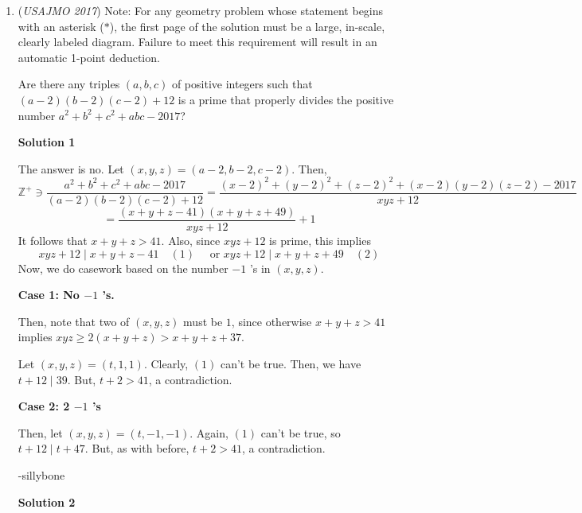 \begin{enumerate}
 By Mathdummy.

 


	\item (\textit{USAJMO 2017}) Note: For any geometry problem whose statement begins with an asterisk ($*$), the first page of the solution must be a large, in-scale, clearly labeled diagram. Failure to meet this requirement will result in an automatic 1-point deduction. 


 Are there any triples $(a,b,c)$ of positive integers such that $(a-2)(b-2)(c-2) + 12$ is a prime that properly divides the positive number $a^2 + b^2 + c^2 + abc - 2017$?


 



\textbf{Solution 1}

The answer is $\boxed{\text{no}}$. Let $(x, y, z) = (a-2, b-2, c-2)$. Then, 
 \[\mathbb{Z}^+ \ni \frac{a^2 + b^2 + c^2 + abc - 2017}{(a-2)(b-2)(c-2)+12} = \frac{(x-2)^2 + (y-2)^2 + (z-2)^2 + (x-2)(y-2)(z-2) - 2017}{xyz+12}\]
 \[= \frac{(x+y+z-41)(x+y+z+49)}{xyz+12}+1\] It follows that $x+y+z> 41$. Also, since $xyz+12$ is prime, this implies 
 \[xyz+12 \mid x+y+z-41 \quad (1) \quad \text{ or } xyz+12\mid x+y+z+49\quad (2)\]Now, we do casework based on the number $-1$ 's in $(x, y, z)$.

 
\textbf{Case 1: No $-1$ 's.} 

 Then, note that two of $(x, y, z)$ must be $1$, since otherwise $x+y+z> 41$ implies $xyz\geq 2(x+y+z) > x+y+z+37$. 

 Let $(x, y, z) = (t, 1, 1)$. Clearly, $(1)$ can't be true. Then, we have $t+12\mid 39$.  But, $t+2> 41$, a contradiction. 

 
\textbf{Case 2: 2 $-1$ 's} 

 Then, let $(x, y, z)=(t, -1, -1)$. Again, $(1)$ can't be true, so $t+12\mid t+47$. But, as with before, $t+2> 41$, a contradiction.

 -sillybone

 


 



\textbf{Solution 2}


\end{enumerate}

